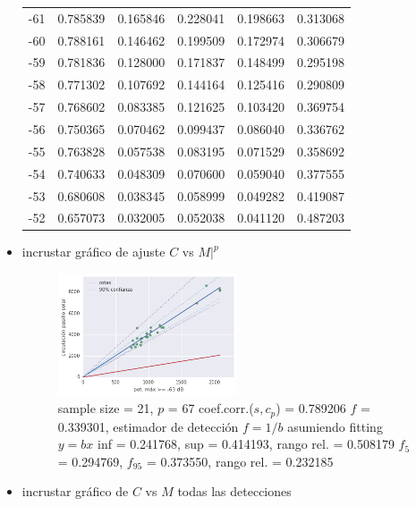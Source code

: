 \begin{itemize}
\begin{table}[]
\begin{tabular}{llllll}
-61 & 0.785839 & 0.165846      & 0.228041      & 0.198663 & 0.313068       \\
-60 & 0.788161 & 0.146462      & 0.199509      & 0.172974 & 0.306679       \\
-59 & 0.781836 & 0.128000      & 0.171837      & 0.148499 & 0.295198       \\
-58 & 0.771302 & 0.107692      & 0.144164      & 0.125416 & 0.290809       \\
-57 & 0.768602 & 0.083385      & 0.121625      & 0.103420 & 0.369754       \\
-56 & 0.750365 & 0.070462      & 0.099437      & 0.086040 & 0.336762       \\
-55 & 0.763828 & 0.057538      & 0.083195      & 0.071529 & 0.358692       \\
-54 & 0.740633 & 0.048309      & 0.070600      & 0.059040 & 0.377555       \\
-53 & 0.680608 & 0.038345      & 0.058999      & 0.049282 & 0.419087       \\
-52 & 0.657073 & 0.032005      & 0.052038      & 0.041120 & 0.487203      
\end{tabular}
\end{table}

\item incrustar gráfico de ajuste $C$ vs $M\big|^p$
\begin{figure}[H] 
  \centering
  \includegraphics[width=0.5\textwidth]{Fig_fit_circulacion_por_jornada.png}
  \caption{
  sample size = 21, $p$ = 67
coef.corr.($s, c_p$) = 0.789206
$f$ = 0.339301, estimador de detección $f = 1/b$ asumiendo fitting $y = b x$
inf = 0.241768, sup = 0.414193, rango rel. = 0.508179
$f_5$ = 0.294769, $f_{95}$ = 0.373550, rango rel. = 0.232185
  }
  \label{fig:fitting_67}
\end{figure}

\item incrustar gráfico de $C$ vs $M$ todas las detecciones


\end{itemize}
